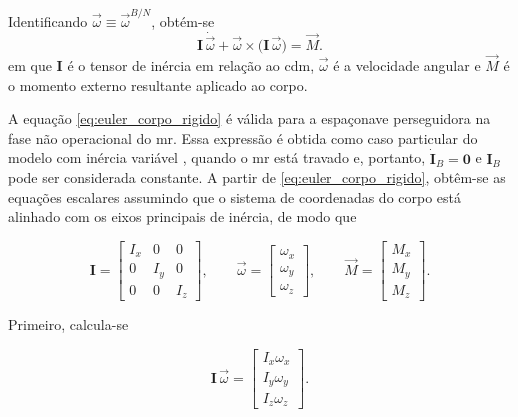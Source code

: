 Identificando $\vec{\omega} \equiv \vec{\omega}^{B/N}$, obtém-se
\begin{equation}
\mathbf{I}\,\dot{\vec{\omega}}
+
\vec{\omega}\times\big(\mathbf{I}\,\vec{\omega}\big)
=
\vec{M}.
\label{eq:euler_corpo_rigido}
\end{equation}
em que $\mathbf{I}$ é o tensor de inércia em relação ao \gls{cdm}, $\vec{\omega}$ é a velocidade angular e $\vec{M}$ é o momento externo resultante aplicado ao corpo.

A equação \eqref{eq:euler_corpo_rigido} é válida para a espaçonave perseguidora na fase não operacional do \gls{mr}.
Essa expressão é obtida como caso particular do modelo com inércia variável \cite{wie2008space}, quando o \gls{mr} está travado e, portanto, $\dot{\mathbf{I}}_B=\mathbf{0}$ e $\mathbf{I}_B$ pode ser considerada constante.
A partir de \eqref{eq:euler_corpo_rigido}, obtêm-se as equações escalares assumindo que o sistema de coordenadas do corpo está alinhado com os eixos principais de inércia, de modo que

\begin{equation}
   \mathbf{I} =
\begin{bmatrix}
I_x & 0   & 0 \\
0   & I_y & 0 \\
0   & 0   & I_z
\end{bmatrix},
\qquad
\vec{\omega} =
\begin{bmatrix}
\omega_x \\[2pt]
\omega_y \\[2pt]
\omega_z
\end{bmatrix},
\qquad
\vec{M} =
\begin{bmatrix}
M_x \\[2pt]
M_y \\[2pt]
M_z
\end{bmatrix}. 
\end{equation}


Primeiro, calcula-se

\begin{equation}
\mathbf{I}\,\vec{\omega}
=
\begin{bmatrix}
I_x \omega_x \\
I_y \omega_y \\
I_z \omega_z
\end{bmatrix}.
\label{eq:Iomega_componentes}
\end{equation}


